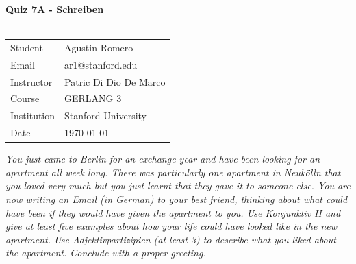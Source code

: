 \documentclass{article}
\begin{document}
\begin{center}
\textbf{\Large{Quiz 7A - Schreiben}}\\~\\
\begin{tabular}{l l}
Student&Agustin Romero\\
Email&ar1@stanford.edu\\
Instructor&Patric Di Dio De Marco\\
Course&GERLANG 3\\
Institution&Stanford University\\
Date&\today\\
\end{tabular}
\end{center}
\textit{You just came to Berlin for an exchange year and have been looking for an apartment all week long. There was particularly one apartment in Neukölln that you loved very much but you just learnt that they gave it to someone else. You are now writing an Email (in German) to your best friend, thinking about what could have been if they would have given the apartment to you. Use Konjunktiv II and give at least five examples about how your life could have looked like in the new apartment. Use Adjektivpartizipien (at least 3) to describe what you liked about the apartment. Conclude with a proper greeting.}\\~\\
\end{document}
